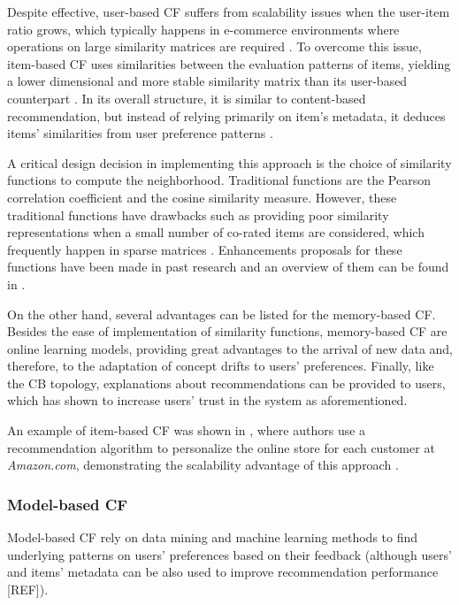     Despite effective, user-based CF suffers from scalability issues when the user-item ratio grows, which typically happens in e-commerce environments where operations on large similarity matrices are required \cite{10.1016/j.ins.2007.07.024, 10.5555/2842045.2842365, 10.1016/j.knosys.2015.03.001}. To overcome this issue, item-based CF uses similarities between the evaluation patterns of items, yielding a lower dimensional and more stable similarity matrix than its user-based counterpart \cite{2003amazon, 10.1155/2009/421425}. In its overall structure, it is similar to content-based recommendation, but instead of relying primarily on item's metadata, it deduces items' similarities from user preference patterns \cite{2001sarwar}.

    A critical design decision in implementing this approach is the choice of similarity functions to compute the neighborhood. Traditional functions are the Pearson correlation coefficient and the cosine similarity measure. However, these traditional functions have drawbacks such as providing poor similarity representations when a small number of co-rated items are considered, which frequently happen in sparse matrices \cite{2016Textbook}. Enhancements proposals for these functions have been made in past research and an overview of them can be found in \cite{10.1145/3133264.3133299}.

    On the other hand, several advantages can be listed for the memory-based CF. Besides the ease of implementation of similarity functions, memory-based CF are online learning models, providing great advantages to the arrival of new data and, therefore, to the adaptation of concept drifts to users' preferences. Finally, like the CB topology, explanations about recommendations can be provided to users, which has shown to increase users' trust in the system as aforementioned.

    An example of item-based CF was shown in \cite{2003amazon}, where authors use a recommendation algorithm to personalize the online store for each customer at \textit{Amazon.com}, demonstrating the scalability advantage of this approach \cite{2003amazon}.

  \subsubsection{Model-based CF}

  Model-based CF rely on data mining and machine learning methods to find underlying patterns on 
  users' preferences based on their feedback (although users' and items' metadata can be also used to 
  improve recommendation performance [REF]). 

